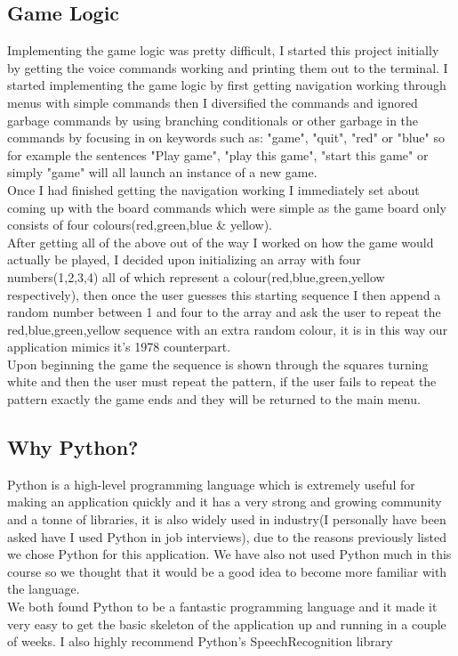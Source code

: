 \documentclass{article}
\begin{document}
\subsection{Game Logic}
Implementing the game logic was pretty difficult, I started this project initially by getting the voice commands working and printing them out to the terminal.  I started implementing the game logic by first getting navigation working through menus with simple commands then I diversified the commands and ignored garbage commands by using branching conditionals or other garbage in the commands by focusing in on keywords such as: "game", "quit", "red" or "blue" so for example the sentences "Play game", "play this game", "start this game" or simply "game" will all launch an instance of a new game. 
\\
Once I had finished getting the navigation working I immediately set about coming up with the board commands which were simple as the game board only consists of four colours(red,green,blue \& yellow). 
\\
After getting all of the above out of the way I worked on how the game would actually be played, I decided upon initializing an array with four numbers(1,2,3,4) all of which represent a colour(red,blue,green,yellow respectively), then once the user guesses this starting sequence I then append a random number between 1 and four to the array and ask the user to repeat the red,blue,green,yellow sequence with an extra random colour, it is in this way our application mimics it's 1978 counterpart.
\\
Upon beginning the game the sequence is shown through the squares turning white and then the user must repeat the pattern, if the user fails to repeat the pattern exactly the game ends and they will be returned to the main menu.
\subsection{Why Python?}
Python is a high-level programming language which is extremely useful for making an application quickly and it has a very strong and growing community and a tonne of libraries, it is also widely used in industry(I personally have been asked have I used Python in job interviews), due to the reasons previously listed we chose Python for this application. We have also not used Python much in this course so we thought that it would be a good idea to become more familiar with the language.
\\
We both found Python to be a fantastic programming language and it made it very easy to get the basic skeleton of the application up and running in a couple of weeks.  I also highly recommend Python's SpeechRecognition library \cite{SpeechRecognition}
\end{document}
